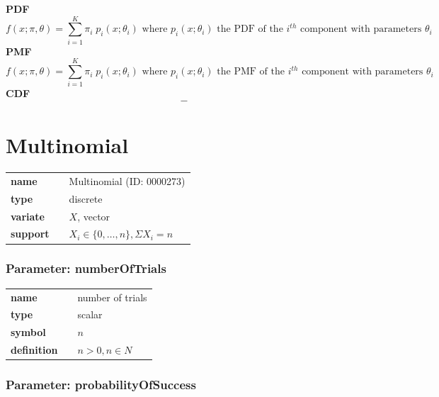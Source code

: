 \smallskip \noindent \hspace{.2cm} \textbf{PDF} 
\begin{equation*}f(x; \pi, \theta) = \sum_{i=1}^{K} \pi_{i}\; p_i(x; \theta_i) \text{ where } p_i(x; \theta_i) \text{ the PDF of the } i^{th} \text{ component with parameters } \theta_i\end{equation*}
\smallskip \noindent \hspace{.2cm} \textbf{PMF} 
\begin{equation*}f(x; \pi, \theta) = \sum_{i=1}^{K} \pi_{i}\; p_i(x; \theta_i) \text{ where } p_i(x; \theta_i) \text{ the PMF of the } i^{th} \text{ component with parameters } \theta_i\end{equation*}
\smallskip \noindent \hspace{.2cm} \textbf{CDF} 
\begin{equation*}-\end{equation*}
\smallskip\section*{Multinomial} 

  \bigskip 

\begin{tabular}{p{2cm}cl}
\textbf{name} & & Multinomial (ID: 0000273)\\ 
 
\textbf{type} & & discrete \\ 

\textbf{variate} & & $X$, vector \\ 

\textbf{support} & & $X_i \in \{0,\dots,n\}, \Sigma X_i = n$
\end{tabular}
\subsubsection*{Parameter: numberOfTrials}

\noindent\begin{tabular}{p{2cm}cl}
\textbf{name} & & number of trials \\
\textbf{type} & & scalar \\
\textbf{symbol} & & $n$  \\
\textbf{definition} & & $n > 0, n \in N$
\end{tabular}
\subsubsection*{Parameter: probabilityOfSuccess}

